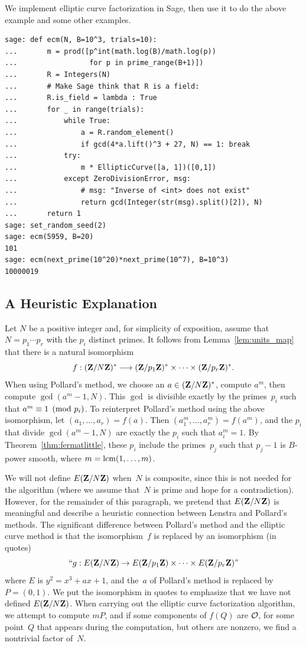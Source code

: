 \begin{sg}
  We implement elliptic curve factorization in Sage, then
  use it to do the above example and some other examples.
\begin{verbatim}
sage: def ecm(N, B=10^3, trials=10):
...       m = prod([p^int(math.log(B)/math.log(p))
...                 for p in prime_range(B+1)])
...       R = Integers(N)
...       # Make Sage think that R is a field:
...       R.is_field = lambda : True
...       for _ in range(trials):
...           while True:
...               a = R.random_element()
...               if gcd(4*a.lift()^3 + 27, N) == 1: break
...           try:
...               m * EllipticCurve([a, 1])([0,1])
...           except ZeroDivisionError, msg:
...               # msg: "Inverse of <int> does not exist"
...               return gcd(Integer(str(msg).split()[2]), N)
...       return 1
sage: set_random_seed(2)
sage: ecm(5959, B=20)
101
sage: ecm(next_prime(10^20)*next_prime(10^7), B=10^3)
10000019
\end{verbatim}
\end{sg}

\subsection{A Heuristic Explanation}\label{sec:methods}
Let $N$ be a positive integer and, for simplicity of exposition,
assume that $N=p_1\cdots p_r$ with the $p_i$ distinct primes.
It follows from Lemma~\ref{lem:units_map} that there is a
natural isomorphism
$$
f : (\mathbf{Z}/N\mathbf{Z})^* \longrightarrow (\mathbf{Z}/p_1\mathbf{Z})^* \times \cdots \times (\mathbf{Z}/p_r\mathbf{Z})^*.
$$
When using Pollard's method, we choose an $a\in (\mathbf{Z}/N\mathbf{Z})^*$,
compute $a^m$, then compute $\gcd(a^m-1,N)$.  This $\gcd$ is divisible
exactly by the primes~$p_i$ such that $a^m \equiv 1\pmod{p_i}$.  To
reinterpret Pollard's method using the above isomorphism, let
$(a_1,\ldots,a_r) = f(a)$.  Then $(a_1^m,\ldots,a_r^m) = f(a^m)$, and
the $p_i$ that divide $\gcd(a^m-1,N)$ are exactly the $p_i$ such that
$a_i^m=1$.  By Theorem~\ref{thm:fermatlittle}, these $p_i$ include the
primes~$p_j$ such that $p_j-1$ is $B$-power smooth, where
$m=\operatorname{lcm}(1,\ldots,m)$.

We will not define $E(\mathbf{Z}/N\mathbf{Z}{})$ when~$N$ is composite, since this is
not needed for the algorithm (where we assume that~$N$ is prime and
hope for a contradiction).  However, for the remainder of this
paragraph, we pretend that $E(\mathbf{Z}/N\mathbf{Z}{})$ is meaningful and describe a
heuristic connection between Lenstra and Pollard's methods.  The
significant difference between Pollard's method and the elliptic curve
method is that the isomorphism~$f$ is replaced by an isomorphism (in
quotes)
$$
``g : E(\mathbf{Z}/N\mathbf{Z}{}) \rightarrow E(\mathbf{Z}/p_1\mathbf{Z}{}) \times \cdots \times E(\mathbf{Z}/p_r\mathbf{Z}{}) \mbox{\rm ''}
$$
where $E$ is $y^2=x^3+ax+1$, and the~$a$ of Pollard's method is
replaced by $P=(0,1)$.  We put the isomorphism in quotes to emphasize
that we have not defined $E(\mathbf{Z}/N\mathbf{Z}{})$.  When carrying out the
elliptic curve factorization algorithm, we attempt to compute $mP$,
and if some components of $f(Q)$ are $\mathcal{O}$, for some point~$Q$ that
appears during the computation, but others are nonzero, we find a
nontrivial factor of~$N$.


